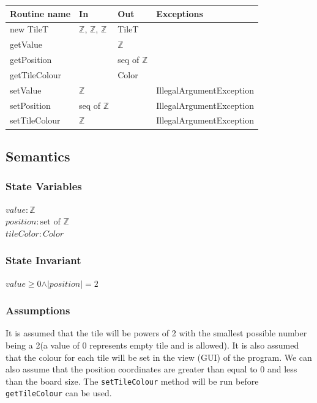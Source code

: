 \documentclass[12pt]{article}
\begin{document}
\begin{tabular}{| l | l | l | p{5cm} |}
\hline
\textbf{Routine name} & \textbf{In} & \textbf{Out} & \textbf{Exceptions}\\
\hline
new TileT & $\mathbb{Z}$, $\mathbb{Z}$, $\mathbb{Z}$ & TileT & ~\\
\hline
getValue & & $\mathbb{Z}$ & ~\\
\hline
getPosition & & seq of $\mathbb{Z}$ & ~\\
\hline
getTileColour & & Color & ~\\
\hline
setValue & $\mathbb{Z}$ & & IllegalArgumentException\\
\hline
setPosition & seq of $\mathbb{Z}$ & & IllegalArgumentException\\
\hline
setTileColour & $\mathbb{Z}$ & & IllegalArgumentException\\
\hline
\end{tabular}

\subsection* {Semantics}

\subsubsection* {State Variables}

$\mathit{value}: \mathbb{Z}$\\
$\mathit{position}: \text{set of $\mathbb{Z}$}$\\
$\mathit{tileColor}: Color$

\subsubsection* {State Invariant}

$value \ge 0 \land \vert position \vert = 2$

\subsubsection* {Assumptions}

It is assumed that the tile will be powers of 2 with the smallest possible number being a 2(a value of 0 represents empty tile and is allowed). It is also assumed that the colour for each tile will be set in the view (GUI) of the program. We can also assume that the position coordinates are greater than equal to 0 and less than the board size. The \verb|setTileColour| method will be run before \verb|getTileColour| can be used.
\end{document}
